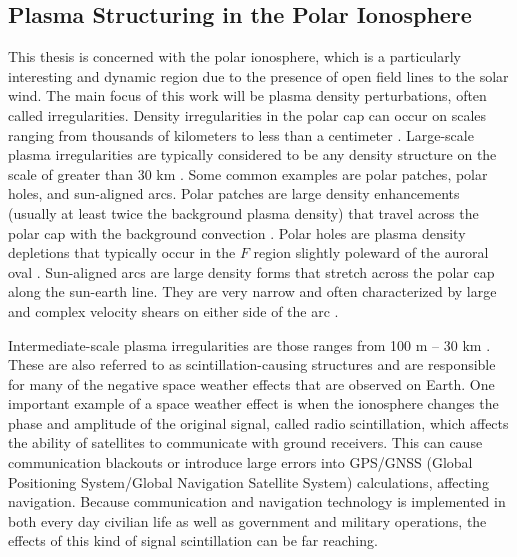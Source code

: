 \subsection{Plasma Structuring in the Polar Ionosphere}
\label{sec:polar_structure}
This thesis is concerned with the polar ionosphere, which is a particularly interesting and dynamic region due to the presence of open field lines to the solar wind.  The main focus of this work will be plasma density perturbations, often called irregularities.  Density irregularities in the polar cap can occur on scales ranging from thousands of kilometers to less than a centimeter \citep{Tsunoda1988}.  Large-scale plasma irregularities are typically considered to be any density structure on the scale of greater than 30 km \citep{Kelley2009}.  Some common examples are polar patches, polar holes, and sun-aligned arcs.  Polar patches are large density enhancements (usually at least twice the background plasma density) that travel across the polar cap with the background convection \citep{Weber1984,Valladares1994}.  Polar holes are plasma density depletions that typically occur in the \(F\) region slightly poleward of the auroral oval \citep{Benson2001}.  Sun-aligned arcs are large density forms that stretch across the polar cap along the sun-earth line.  They are very narrow and often characterized by large and complex velocity shears on either side of the arc \citep{Valladares1991}.

Intermediate-scale plasma irregularities are those ranges from 100 m -- 30 km \citep{Kelley2009}.  These are also referred to as scintillation-causing structures and are responsible for many of the negative space weather effects that are observed on Earth.  One important example of a space weather effect is when the ionosphere changes the phase and amplitude of the original signal, called radio scintillation, which affects the ability of satellites to communicate with ground receivers.  This can cause communication blackouts or introduce large errors into GPS/GNSS (Global Positioning System/Global Navigation Satellite System) calculations, affecting navigation.  Because communication and navigation technology is implemented in both every day civilian life as well as government and military operations, the effects of this kind of signal scintillation can be far reaching.

